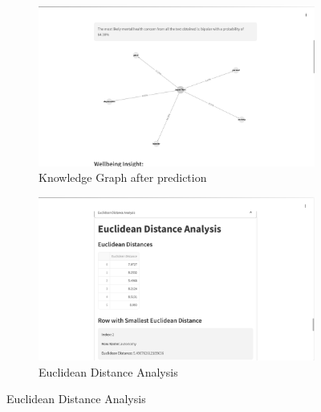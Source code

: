 \begin{figure}[H]
    \begin{subfigure}[b]{0.495\textwidth}
        \centering
        \includegraphics[width=\textwidth]{App Images/19 Interface.png}
        \caption{Knowledge Graph after prediction}
        \label{fig:10i23445}
    \end{subfigure}
    \hfill
    \begin{subfigure}[b]{0.495\textwidth}
        \centering
        \includegraphics[width=\textwidth]{App Images/24 Interface.png}
        \caption{Euclidean Distance Analysis}
        \label{fig:03i}
    \end{subfigure}

    \vspace{1em}


\end{figure}
